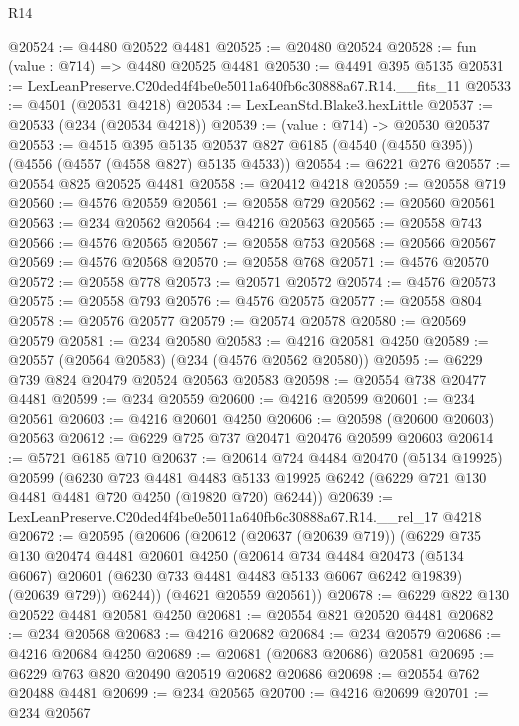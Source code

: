 \begin{lexlean}{R14}
\begin{coremodule}
@20524 := @4480 @20522 @4481
@20525 := @20480 @20524
@20528 := fun (value : @714) => @4480 @20525 @4481
@20530 := @4491 @395 @5135
@20531 := LexLeanPreserve.C20ded4f4be0e5011a640fb6c30888a67.R14.__fits_11
@20533 := @4501 (@20531 @4218)
@20534 := LexLeanStd.Blake3.hexLittle
@20537 := @20533 (@234 (@20534 @4218))
@20539 := (value : @714) -> @20530 @20537
@20553 := @4515
    @395
    @5135
    @20537
    @827
    @6185
    (@4540 (@4550 @395))
    (@4556 (@4557 (@4558 @827) @5135 @4533))
@20554 := @6221 @276
@20557 := @20554 @825 @20525 @4481
@20558 := @20412 @4218
@20559 := @20558 @719
@20560 := @4576 @20559
@20561 := @20558 @729
@20562 := @20560 @20561
@20563 := @234 @20562
@20564 := @4216 @20563
@20565 := @20558 @743
@20566 := @4576 @20565
@20567 := @20558 @753
@20568 := @20566 @20567
@20569 := @4576 @20568
@20570 := @20558 @768
@20571 := @4576 @20570
@20572 := @20558 @778
@20573 := @20571 @20572
@20574 := @4576 @20573
@20575 := @20558 @793
@20576 := @4576 @20575
@20577 := @20558 @804
@20578 := @20576 @20577
@20579 := @20574 @20578
@20580 := @20569 @20579
@20581 := @234 @20580
@20583 := @4216 @20581 @4250
@20589 := @20557 (@20564 @20583) (@234 (@4576 @20562 @20580))
@20595 := @6229 @739 @824 @20479 @20524 @20563 @20583
@20598 := @20554 @738 @20477 @4481
@20599 := @234 @20559
@20600 := @4216 @20599
@20601 := @234 @20561
@20603 := @4216 @20601 @4250
@20606 := @20598 (@20600 @20603) @20563
@20612 := @6229 @725 @737 @20471 @20476 @20599 @20603
@20614 := @5721 @6185 @710
@20637 := @20614
    @724
    @4484
    @20470
    (@5134 @19925)
    @20599
    (@6230
      @723
      @4481
      @4483
      @5133
      @19925
      @6242
      (@6229 @721 @130 @4481 @4481 @720 @4250 (@19820 @720) @6244))
@20639 := LexLeanPreserve.C20ded4f4be0e5011a640fb6c30888a67.R14.__rel_17 @4218
@20672 := @20595
    (@20606
      (@20612
        (@20637 (@20639 @719))
        (@6229
          @735
          @130
          @20474
          @4481
          @20601
          @4250
          (@20614
            @734
            @4484
            @20473
            (@5134 @6067)
            @20601
            (@6230 @733 @4481 @4483 @5133 @6067 @6242 @19839)
            (@20639 @729))
          @6244))
      (@4621 @20559 @20561))
@20678 := @6229 @822 @130 @20522 @4481 @20581 @4250
@20681 := @20554 @821 @20520 @4481
@20682 := @234 @20568
@20683 := @4216 @20682
@20684 := @234 @20579
@20686 := @4216 @20684 @4250
@20689 := @20681 (@20683 @20686) @20581
@20695 := @6229 @763 @820 @20490 @20519 @20682 @20686
@20698 := @20554 @762 @20488 @4481
@20699 := @234 @20565
@20700 := @4216 @20699
@20701 := @234 @20567

\end{coremodule}
\end{lexlean}
